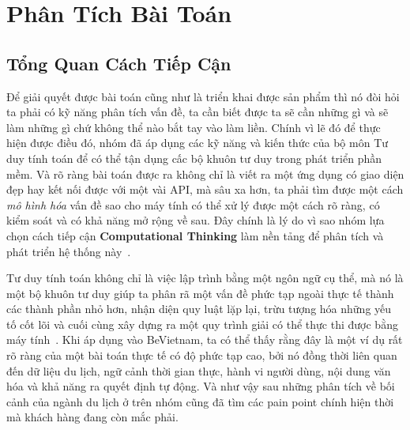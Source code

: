 \section{Phân Tích Bài Toán}

\subsection{Tổng Quan Cách Tiếp Cận}
\contrib
Để giải quyết được bài toán cũng như là triển khai được sản phẩm thì nó đòi hỏi
ta phải có kỹ năng phân tích vấn đề, ta cần biết được ta sẽ cần những gì và sẽ làm những gì
chứ không thể nào bắt tay vào làm liền. Chính vì lẽ đó để thực hiện được điều đó, nhóm đã áp dụng
các kỹ năng và kiến thức của bộ môn Tư duy tính toán để có thể tận dụng cấc bộ khuôn tư duy trong phát triển phần mềm.
Và rõ ràng bài toán được ra không chỉ là viết ra một ứng dụng có giao diện đẹp hay kết nối được với một vài
API, mà sâu xa hơn, ta phải tìm được một cách \textit{mô hình hóa} vấn
đề sao cho máy tính có thể xử lý được một cách rõ ràng, có kiểm soát
và có khả năng mở rộng về sau. Đây chính là lý do vì sao nhóm lựa chọn
cách tiếp cận \textbf{Computational Thinking} làm nền tảng để phân tích
và phát triển hệ thống này~\cite{wing2006, spronck2023, dejesus2020}.

Tư duy tính toán không chỉ là việc lập trình bằng một ngôn ngữ cụ thể, mà nó là
một bộ khuôn tư duy giúp ta phân rã một vấn đề phức tạp ngoài thực tế
thành các thành phần nhỏ hơn, nhận diện quy luật lặp lại, trừu tượng hóa
những yếu tố cốt lõi và cuối cùng xây dựng ra một quy trình giải có thể
thực thi được bằng máy tính~\cite{spronck2023}. Khi áp dụng vào
BeVietnam, ta có thể thấy rằng đây là một ví dụ rất rõ ràng của một bài
toán thực tế có độ phức tạp cao, bởi nó đồng thời liên quan đến dữ liệu
du lịch, ngữ cảnh thời gian thực, hành vi người dùng, nội dung văn hóa
và khả năng ra quyết định tự động. Và như vậy sau những phân tích về bối cảnh của ngành du lịch ở trên
nhóm cũng đã tìm các pain point chính hiện thời mà khách hàng đang còn mắc phải.


